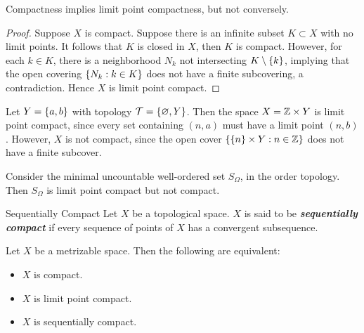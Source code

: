 \documentclass[12pt,a4paper]{article}
\begin{document}
    \begin{thm}
        Compactness implies limit point compactness, but not conversely.
    \end{thm}
    \begin{proof}
        Suppose $X$ is compact. Suppose there is an infinite subset $K\subset X$ with no limit points. It follows that $K$ is closed in $X$, then $K$ is compact. However, for each $k\in K$, there is a neighborhood $N_k$ not intersecting $K\setminus\left\{k\right\}$, implying that the open covering $\left\{N_k:k\in K\right\}$ does not have a finite subcovering, a contradiction. Hence $X$ is limit point compact.
    \end{proof}
    \hfill

    \begin{eg}
        Let $Y=\left\{a,b\right\}$ with topology $\mathcal{T}=\left\{\varnothing,Y\right\}$. Then the space $X=\mathbb{Z}\times Y$ is limit point compact, since every set containing $(n,a)$ must have a limit point $(n,b)$. However, $X$ is not compact, since the open cover $\left\{\left\{n\right\}\times Y:n\in\mathbb{Z}\right\}$ does not have a finite subcover.
    \end{eg}
    \hfill

    \begin{eg}
        Consider the minimal uncountable well-ordered set $S_\Omega$, in the order topology. Then $S_\Omega$ is limit point compact but not compact.
    \end{eg}
    \hfill

    \begin{defi}{Sequentially Compact}
        Let $X$ be a topological space. $X$ is said to be \textbf{\textit{sequentially compact}} if every sequence of points of $X$ has a convergent subsequence.
    \end{defi}
    \hfill

    \begin{thm}\label{3.6.6}
        Let $X$ be a metrizable space. Then the following are equivalent:
        \begin{itemize}
            \item $X$ is compact.
            \item $X$ is limit point compact.
            \item $X$ is sequentially compact.
        \end{itemize}
    \end{thm}
    \hfill
\end{document}

